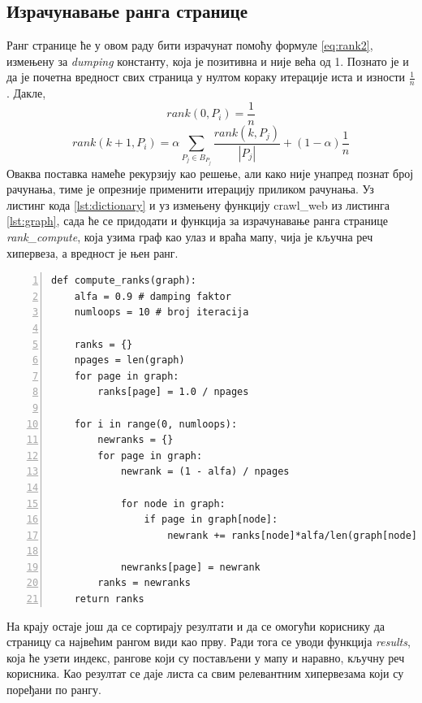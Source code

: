 \documentclass[11pt, serbianc, english, titlepage]{article}
\begin{document}
		\subsection{Израчунавање ранга странице}
		Ранг странице ће у овом раду бити израчунат помоћу формуле \ref{eq:rank2}, измењену за \emph{dumping} константу, која је позитивна и није већа од 1. Познато је и да је почетна вредност свих страница у нултом кораку итерације иста и изности $\frac{1}{n}$. Дакле,
		\begin{equation}\label{eq:zero}
		rank(0, P_{i})=\frac{1}{n}
		\end{equation}
		\begin{equation}
		rank(k+1, P_{i})=\alpha \sum_{P_{j} \in B_{P_{j}}}\frac{rank(k, P_{j})}{\left |P_{j}  \right |} + (1-\alpha)\frac{1}{n}
		\end{equation}
		Оваква поставка намеће рекурзију као решење, али како није унапред познат број рачунања, тиме је опрезније применити итерацију приликом рачунања. Уз листинг кода \ref{lst:dictionary} и уз измењену функцију crawl\_web из листинга \ref{lst:graph}, сада ће се придодати и функција за израчунавање ранга странице \emph{rank\_compute}, која узима граф као улаз и враћа мапу, чија је кључна реч хипервеза, а вредност је њен ранг.
		\pagebreak
		\begin{lstlisting}[caption=Израчунавање ранга странице, label={lst:rank}, numbers=left]
def compute_ranks(graph):
    alfa = 0.9 # damping faktor
    numloops = 10 # broj iteracija
    
    ranks = {}
    npages = len(graph)
    for page in graph:
        ranks[page] = 1.0 / npages
    
    for i in range(0, numloops):
        newranks = {}
        for page in graph:
            newrank = (1 - alfa) / npages
            
            for node in graph:
                if page in graph[node]:
                    newrank += ranks[node]*alfa/len(graph[node])
            
            newranks[page] = newrank
        ranks = newranks
    return ranks
		\end{lstlisting}
		На крају остаје још да се сортирају резултати и да се омогући кориснику да страницу са највећим рангом види као прву. Ради тога се уводи функција \emph{results}, која ће узети индекс, рангове који су постављени у мапу и наравно, кључну реч корисника. Као резултат се даје листа са свим релевантним хипервезама који су поређани по рангу. 
\end{document}
